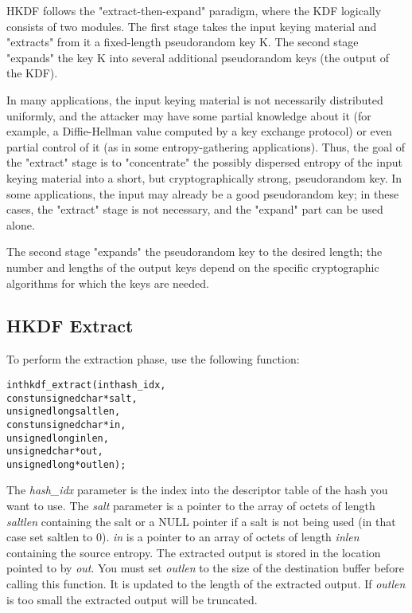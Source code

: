 \documentclass[synpaper]{book}
\begin{document}
HKDF follows the "extract-then-expand" paradigm, where the KDF logically consists of two modules.  The first stage takes the input
keying material and "extracts" from it a fixed-length pseudorandom key K.  The second stage "expands" the key K into several additional
pseudorandom keys (the output of the KDF).

In many applications, the input keying material is not necessarily distributed uniformly, and the attacker may have some partial
knowledge about it (for example, a Diffie-Hellman value computed by a key exchange protocol) or even partial control of it (as in some
entropy-gathering applications).  Thus, the goal of the "extract" stage is to "concentrate" the possibly dispersed entropy of the input
keying material into a short, but cryptographically strong, pseudorandom key.  In some applications, the input may already be a
good pseudorandom key; in these cases, the "extract" stage is not necessary, and the "expand" part can be used alone.

The second stage "expands" the pseudorandom key to the desired length; the number and lengths of the output keys depend on the
specific cryptographic algorithms for which the keys are needed.

\subsection{HKDF Extract}
To perform the extraction phase, use the following function:

\begin{alltt}
int hkdf_extract(   int  hash_idx,
    const unsigned char *salt,
          unsigned long  saltlen,
    const unsigned char *in,
          unsigned long  inlen,
          unsigned char *out,
          unsigned long *outlen);
\end{alltt}
The \textit{hash\_idx} parameter is the index into the descriptor table of the hash you want to use.
The \textit{salt} parameter is a pointer to the array of octets of length \textit{saltlen} containing the salt or a NULL pointer if a salt is not being used (in that case set saltlen to 0).
\textit{in} is a pointer to an array of octets of length \textit{inlen} containing the source entropy.  The extracted output is stored in the location pointed to by \textit{out}.
You must set \textit{outlen} to the size of the destination buffer before calling this function. It is updated to the length of the extracted output. If \textit{outlen} is too small the extracted output will be truncated.
\end{document}
